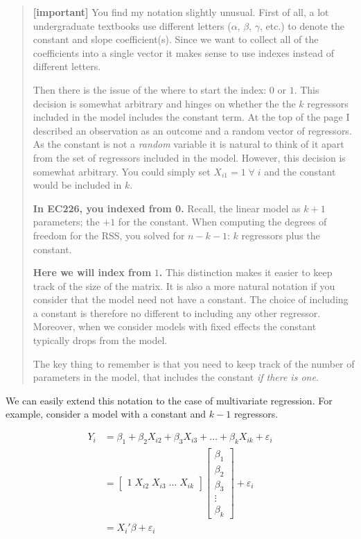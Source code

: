 \documentclass[
  letterpaper,
  DIV=11,
  numbers=noendperiod]{scrreprt}
\begin{document}
\begin{quote}
\textbf{{[}important{]}} You find my notation slightly unusual. First of
all, a lot undergraduate textbooks use different letters (\(\alpha\),
\(\beta\), \(\gamma\), etc.) to denote the constant and slope
coefficient(s). Since we want to collect all of the coefficients into a
single vector it makes sense to use indexes instead of different
letters.

Then there is the issue of the where to start the index: \(0\) or \(1\).
This decision is somewhat arbitrary and hinges on whether the the \(k\)
regressors included in the model includes the constant term. At the top
of the page I described an observation as an outcome and a random vector
of regressors. As the constant is not a \emph{random} variable it is
natural to think of it apart from the set of regressors included in the
model. However, this decision is somewhat arbitrary. You could simply
set \(X_{i1} = 1\;\forall\;i\) and the constant would be included in
\(k\).

\textbf{In EC226, you indexed from 0.} Recall, the linear model as
\(k+1\) parameters; the \(+1\) for the constant. When computing the
degrees of freedom for the RSS, you solved for \(n-k-1\): \(k\)
regressors plus the constant.

\textbf{Here we will index from} \(1\)\textbf{.} This distinction makes
it easier to keep track of the size of the matrix. It is also a more
natural notation if you consider that the model need not have a
constant. The choice of including a constant is therefore no different
to including any other regressor. Moreover, when we consider models with
fixed effects the constant typically drops from the model.

The key thing to remember is that you need to keep track of the number
of parameters in the model, that includes the constant \emph{if there is
one}.
\end{quote}

We can easily extend this notation to the case of multivariate
regression. For example, consider a model with a constant and \(k-1\)
regressors.

\[
\begin{align} Y_i &= \beta_1 + \beta_2 X_{i2} + \beta_3 X_{i3} + \ldots + \beta_k X_{ik} + \varepsilon_i \\
&= \begin{bmatrix} 1\; X_{i2}\; X_{i3}\; \dots\; X_{ik} \end{bmatrix} \begin{bmatrix} \beta_1\\ \beta_2\\ \beta_3\\ \vdots\\ \beta_k\end{bmatrix} + \varepsilon_i \\
&=X_i'\beta + \varepsilon_i
\end{align}
\]
\end{document}
